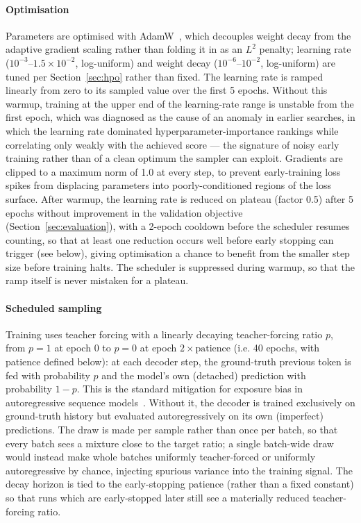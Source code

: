 \paragraph{Optimisation}
Parameters are optimised with AdamW~\cite{loshchilov2019adamw}, which decouples weight decay from the adaptive gradient scaling rather than folding it in as an $L^2$ penalty; learning rate ($10^{-3}$--$1.5\times10^{-2}$, log-uniform) and weight decay ($10^{-6}$--$10^{-2}$, log-uniform) are tuned per Section~\ref{sec:hpo} rather than fixed. The learning rate is ramped linearly from zero to its sampled value over the first 5 epochs. Without this warmup, training at the upper end of the learning-rate range is unstable from the first epoch, which was diagnosed as the cause of an anomaly in earlier searches, in which the learning rate dominated hyperparameter-importance rankings while correlating only weakly with the achieved score — the signature of noisy early training rather than of a clean optimum the sampler can exploit. Gradients are clipped to a maximum norm of 1.0 at every step, to prevent early-training loss spikes from displacing parameters into poorly-conditioned regions of the loss surface. After warmup, the learning rate is reduced on plateau (factor 0.5) after 5 epochs without improvement in the validation objective (Section~\ref{sec:evaluation}), with a 2-epoch cooldown before the scheduler resumes counting, so that at least one reduction occurs well before early stopping can trigger (see below), giving optimisation a chance to benefit from the smaller step size before training halts. The scheduler is suppressed during warmup, so that the ramp itself is never mistaken for a plateau.

\paragraph{Scheduled sampling}
Training uses teacher forcing with a linearly decaying teacher-forcing ratio $p$, from $p=1$ at epoch 0 to $p=0$ at epoch $2\times\text{patience}$ (i.e. 40 epochs, with patience defined below): at each decoder step, the ground-truth previous token is fed with probability $p$ and the model's own (detached) prediction with probability $1-p$. This is the standard mitigation for exposure bias in autoregressive sequence models~\cite{bengio2015scheduledsampling}.  Without it, the decoder is trained exclusively on ground-truth history but evaluated autoregressively on its own (imperfect) predictions. The draw is made per sample rather than once per batch, so that every batch sees a mixture close to the target ratio; a single batch-wide draw would instead make whole batches uniformly teacher-forced or uniformly autoregressive by chance, injecting spurious variance into the training signal. The decay horizon is tied to the early-stopping patience (rather than a fixed constant) so that runs which are early-stopped later still see a materially reduced teacher-forcing ratio.

